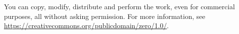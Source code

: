 \documentclass{notes}
\begin{document}
You can copy, modify, distribute and perform the work, even for commercial purposes, all without asking permission. For more information, see \url{https://creativecommons.org/publicdomain/zero/1.0/}.

\tableofcontents %

\newpage










\printbibliography

\newpage


\end{document}
